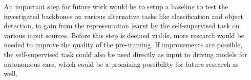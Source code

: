 An important step for future work would be to setup a baseline to test the investigated backbones on various alternative tasks like classification and object detection, to gain from the representation learnt by the self-supervised task on various input sources. Before this step is deemed viable, more research would be needed to improve the quality of the pre-training. If improvements are possible, the self-supervised task could also be used directly as input to driving models for autonomous cars, which could be a promising possibility for future research as well. 


